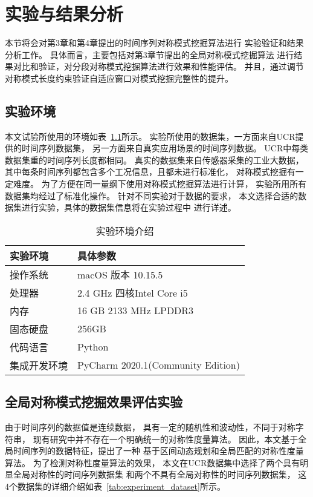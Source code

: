 
\chapter{实验与结果分析}
本节将会对第3章和第4章提出的时间序列对称模式挖掘算法进行
实验验证和结果分析工作。
具体而言，主要包括对第3章节提出的全局对称模式挖掘算法
进行结果对比和验证，对分段对称模式挖掘算法进行效果和性能评估。
并且，通过调节对称模式长度约束验证自适应窗口对模式挖掘完整性的提升。

\section{实验环境}
本文试验所使用的环境如表~\ref{tab:experiment_enviroment}所示。
实验所使用的数据集，一方面来自UCR提供的时间序列数据集，
另一方面来自真实应用场景的时间序列数据。
UCR中每类数据集重的时间序列长度都相同。
真实的数据集来自传感器采集的工业大数据，
其中每条时间序列都包含多个工况信息，且都未进行标准化，
对称模式挖掘有一定难度。
为了方便在同一量纲下使用对称模式挖掘算法进行计算，
实验所用所有数据集均经过了标准化操作。
针对不同实验对于数据的要求，
本文选择合适的数据集进行实验，具体的数据集信息将在实验过程中
进行详述。

\begin{table}
  \centering
  \caption{实验环境介绍}
  \begin{tabular}{ll}
    \toprule
    实验环境     & 具体参数                          \\
    \midrule
    操作系统     & macOS 版本 10.15.5                \\
    处理器       & 2.4 GHz 四核Intel Core i5         \\
    内存         & 16 GB 2133 MHz LPDDR3             \\
    固态硬盘     & 256GB                             \\
    代码语言     & Python                            \\
    集成开发环境 & PyCharm 2020.1(Community Edition) \\
    \bottomrule
  \end{tabular}
  \label{tab:experiment_enviroment}
\end{table}

\section{全局对称模式挖掘效果评估实验}
由于时间序列的数据值是连续数据，
具有一定的随机性和波动性，不同于对称字符串，
现有研究中并不存在一个明确统一的对称性度量算法。
因此，本文基于全局时间序列的数据特征，提出了一种
基于区间动态规划和全局匹配的对称性度量算法。
为了检测对称性度量算法的效果，
本文在UCR数据集中选择了两个具有明显全局对称性的时间序列数据集
和两个不具有全局对称性的时间序列数据集，
这4个数据集的详细介绍如表~\ref{tab:experiment_dataset}所示。

